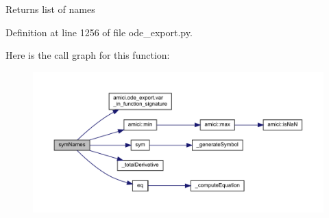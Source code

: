 \begin{DoxyReturn}{Returns}
list of names 
\end{DoxyReturn}


Definition at line 1256 of file ode\+\_\+export.\+py.

Here is the call graph for this function\+:
\nopagebreak
\begin{figure}[H]
\begin{center}
\leavevmode
\includegraphics[width=350pt]{classamici_1_1ode__export_1_1_o_d_e_model_a2223bbe62f3234b8f40c5a566064a481_cgraph}
\end{center}
\end{figure}
